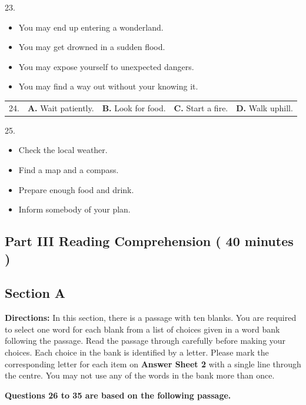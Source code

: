 \documentclass[UTF8,11pt]{ctexart}
\begin{document}
23.


\begin{itemize}[leftmargin=2em,itemsep=.2em,topsep=.4em]\item[A.] You may end up entering a wonderland.
\item[B.] You may get drowned in a sudden flood.
\item[C.] You may expose yourself to unexpected dangers.
\item[D.] You may find a way out without your knowing it.
\end{itemize}

\noindent\begin{tabularx}{\linewidth}{@{}lXXXX@{}}24. & \textbf{A.} Wait patiently. & \textbf{B.} Look for food. & \textbf{C.} Start a fire. & \textbf{D.} Walk uphill.\\\end{tabularx}\par

25.


\begin{itemize}[leftmargin=2em,itemsep=.2em,topsep=.4em]\item[A.] Check the local weather.
\item[B.] Find a map and a compass.
\item[C.] Prepare enough food and drink.
\item[D.] Inform somebody of your plan.
\end{itemize}

\subsection*{\textbf{Part} III \textbf{Reading Comprehension} \textbf{( 40 minutes )}}


\subsection*{\textbf{Section A}}


\textbf{Directions:} In this section, there is a passage with ten blanks. You are required to select one word for each blank from a list of choices given in a word bank following the passage. Read the passage through carefully before making your choices. Each choice in the bank is identified by a letter. Please mark the corresponding letter for each item on\textbf{ Answer Sheet 2} with a single line through the centre. You may not use any of the words in the bank more than once.


\textbf{Questions 26 to 35 are based on the following passage.}
\end{document}

